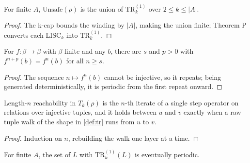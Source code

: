 \begin{lemma}
\label{lem:unsafe-biunion}
\leanok
{}
For finite $A$, $\mathrm{Unsafe}(\rho)$ is the union of $\mathrm{TR}_k^{(1)}$
over $2 \leq k \leq |A|$.
\end{lemma}

\begin{proof}
\leanok
{}
The k-cap bounds the winding by $|A|$, making the union finite; Theorem P
converts each $\mathrm{LISC}_k$ into $\mathrm{TR}_k^{(1)}$.
\end{proof}

\begin{lemma}
\label{lem:iterate}
\leanok
For $f : \beta \to \beta$ with $\beta$ finite and any $b$, there are $s$ and
$p > 0$ with $f^{n+p}(b) = f^{n}(b)$ for all $n \geq s$.
\end{lemma}

\begin{proof}
\leanok
The sequence $n \mapsto f^n(b)$ cannot be injective, so it repeats; being
generated deterministically, it is periodic from the first repeat onward.
\end{proof}

\begin{lemma}
\label{lem:reach-walk}
\leanok
{}
Length-$n$ reachability in $T_k(\rho)$ is the $n$-th iterate of a single step
operator on relations over injective tuples, and it holds between $u$ and $v$
exactly when a raw tuple walk of the shape in \ref{def:tr} runs from $u$ to
$v$.
\end{lemma}

\begin{proof}
\leanok
Induction on $n$, rebuilding the walk one layer at a time.
\end{proof}

\begin{lemma}
\label{lem:evper-tr}
\leanok
{}
For finite $A$, the set of $L$ with $\mathrm{TR}_k^{(1)}(L)$ is eventually
periodic.
\end{lemma}

